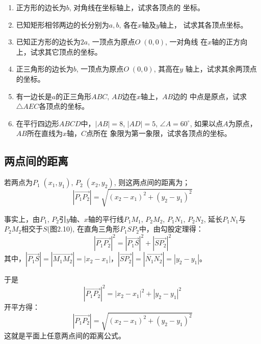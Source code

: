 \begin{ex}
\begin{enumerate}
    \item 正方形的边长为$b$, 对角线在坐标轴上，试求各顶点的
    坐标。
    \item 已知矩形相邻两边的长分别为$a,b$, 各在$x$轴及$y$轴上，
    试求其各顶点坐标。
    \item 已知正方形的边长为$2a$, 一顶点为原点$O\;(0,0)$, 一对角线
    在$x$轴的正方向上，试求其它顶点的坐标。
    \item 正三角形的边长为$b$, 一顶点为原点$O\;(0,0)$, 其高在$y$
    轴上，试求其余两顶点的坐标。
    \item 有一边长是$a$的正三角形$ABC$, $AB$边在$x$轴上，$AB$边的
    中点是原点，试求$\triangle AEC$各顶点的坐标。
    \item 在平行四边形$ABCD$中，$|AB|=8$, $|AD|=5$, $\angle A=
    60^{\circ}$, 如果以点$A$为原点，$AB$所在直线为$x$轴，$C$点所在
    象限为第一象限，试求各顶点的坐标。
\end{enumerate}
\end{ex}

\subsection{两点间的距离}
若两点为$P_1\;(x_1,y_1)$, $P_2\;(x_2,y_2)$, 则这两点间的距离为；
$$|\Vec{P_1P_2}|=\sqrt{(x_2-x_1)^2+(y_2-y_1)^2}$$

\begin{figure}[htp]
    \centering
{}
    \caption{}
\end{figure}



事实上，由$P_1$, $P_2$引$y$轴、$x$轴的平行线$P_1M_1$, $P_2M_2$,
$P_1N_1$, $P_2N_2$, 延长$P_1N_1$与$P_2M_2$相交于$S$(图2.10), 在直角三角形$P_1SP_2$中，由勾股定理得：
\[|\Vec{P_1P_2}|^2=|\Vec{P_1S}|^2+|\Vec{SP_2}|^2 \]
其中，$|\Vec{P_1S}|=|\Vec{M_1M_2}|=|x_2-x_1|$，$|\Vec{SP_2}|=|\Vec{N_1N_2}|=|y_2-y_1|$。

于是$$|\Vec{P_1P_2}|^2=|x_2-x_1|^2+|y_2-y_1|^2$$
开平方得：
$$|\Vec{P_1P_2}|=\sqrt{(x_2-x_1)^2+(y_2-y_1)^2}$$
这就是平面上任意两点间的距离公式。

